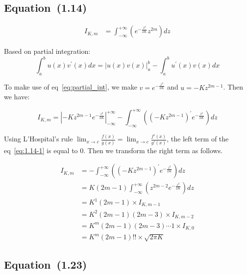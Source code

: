 
\subsection{Equation~(1.14)}

\begin{align}
I_{K,m} &= \int_{-\infty}^{+\infty}\left(
    e^{-\frac{z^2}{2K}}z^{2m} 
    \right) dz 
\end{align}

Based on partial integration: %
\begin{equation}
 \label{eq:partial_int}
    \int_{a}^{b}{u(x)v^{'}(x)dx} =  {\left | u(x)v(x) \right |}_{a}^{b} - \int_{a}^{b}{u^{'}(x)v(x)dx} 
\end{equation}


        
To make use of eq~\eqref{eq:partial_int}, we make $v=e^{-\frac{z^2}{2K}}$ and $u=-K z^{2m-1}$. Then we have:

\begin{equation}
\label{eq:1.14-1}
    I_{K,m} 
        = {\left | -K z^{2m-1} e^{-\frac{z^2}{2K}} \right |}_{-\infty}^{+\infty} - \int_{-\infty}^{+\infty}\left(
            (-K z^{2m-1})^{'} e^{-\frac{z^2}{2K}}
        \right) dz 
\end{equation}

Using L'Hospital's rule $\lim_{x\rightarrow c}\frac{f(x)}{g(x)} = \lim_{x\rightarrow c}\frac{f'(x)}{g'(x)}$, %
the left term of the eq~\eqref{eq:1.14-1} is equal to $0$. Then we transform the right term as follows.

\begin{equation}
    \begin{split}
        I_{K,m} 
            &= - \int_{-\infty}^{+\infty}\left(
                (-K z^{2m-1})^{'} e^{-\frac{z^2}{2K}}
            \right) dz \\
            &= K(2m-1) \int_{-\infty}^{+\infty}\left(
                z^{2m-2} e^{-\frac{z^2}{2K}}
            \right) dz \\
            &= K^1(2m-1) \times I_{K,m-1} \\
            &= K^2 (2m-1)(2m-3) \times I_{K,m-2} \\
            &= K^m (2m-1)(2m-3)\cdots 1 \times I_{K,0} \\
            &= K^m (2m-1)!! \times \sqrt{2\pi K} 
    \end{split}
\end{equation}


\subsection{Equation~(1.23)}

